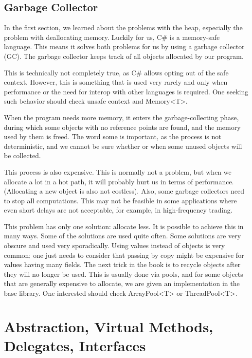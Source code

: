 \subsection{Garbage Collector}
In the first section, we learned about the problems with the heap, especially the problem with deallocating memory. Luckily for us, C\# is a memory-safe language. This means it solves both problems for us by using a garbage collector (GC). The garbage collector keeps track of all objects allocated by our program.

\begin{rem}
    This is technically not completely true, as C\# allows opting out of the safe context. However, this is something that is used very rarely and only when performance or the need for interop with other languages is required. One seeking such behavior should check unsafe context and Memory<T>.
\end{rem}

When the program needs more memory, it enters the garbage-collecting phase, during which some objects with no reference points are found, and the memory used by them is freed. The word some is important, as the process is not deterministic, and we cannot be sure whether or when some unused objects will be collected.

This process is also expensive. This is normally not a problem, but when we allocate a lot in a hot path, it will probably hurt us in terms of performance. (Allocating a new object is also not costless). Also, some garbage collectors need to stop all computations. This may not be feasible in some applications where even short delays are not acceptable, for example, in high-frequency trading.

This problem has only one solution: allocate less. It is possible to achieve this in many ways. Some of the solutions are used quite often. Some solutions are very obscure and used very sporadically. Using values instead of objects is very common; one just needs to consider that passing by copy might be expensive for values having many fields. The next trick in the book is to recycle objects after they will no longer be used. This is usually done via pools, and for some objects that are generally expensive to allocate, we are given an implementation in the base library. One interested should check ArrayPool<T> or ThreadPool<T>.

\section{Abstraction, Virtual Methods, Delegates, Interfaces}

